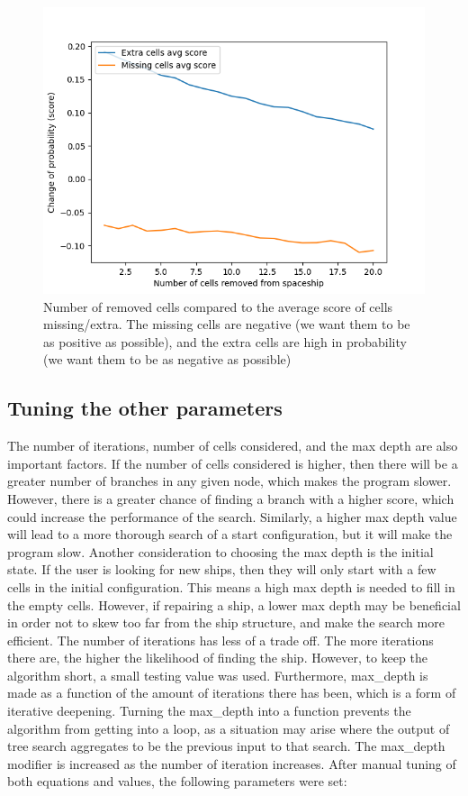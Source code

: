 \documentclass{l4proj}
\begin{document}
\begin{figure}[h!]
\centering
\includegraphics[width=0.8\linewidth]{dissertation/images/graphs/cells_added_n_cells_extra_missing_probability_score_analysis.png}
\caption{Number of removed cells compared to the average score of cells missing/extra. The missing cells are negative (we want them to be as positive as possible), and the extra cells are high in probability (we want them to be as negative as possible)}
\label{fig:subim1}
\end{figure}

\subsection{Tuning the other parameters}

The number of iterations, number of cells considered, and the max depth are also important factors. If the number of cells considered is higher, then there will be a greater number of branches in any given node, which makes the program slower. However, there is a greater chance of finding a branch with a higher score, which could increase the performance of the search. Similarly, a higher max depth value will lead to a more thorough search of a start configuration, but it will make the program slow. Another consideration to choosing the max depth is the initial state. If the user is looking for new ships, then they will only start with a few cells in the initial configuration. This means a high max depth is needed to fill in the empty cells. However, if repairing a ship, a lower max depth may be beneficial in order not to skew too far from the ship structure, and make the search more efficient. The number of iterations has less of a trade off. The more iterations there are, the higher the likelihood of finding the ship. However, to keep the algorithm short, a small testing value was used. Furthermore, max\_depth is made as a function of the amount of iterations there has been, which is a form of iterative deepening. Turning the max\_depth into a function prevents the algorithm from getting into a loop, as a situation may arise where the output of tree search aggregates to be the previous input to that search. The max\_depth modifier is increased as the number of iteration increases. After manual tuning of both equations and values, the following parameters were set:
\end{document}
